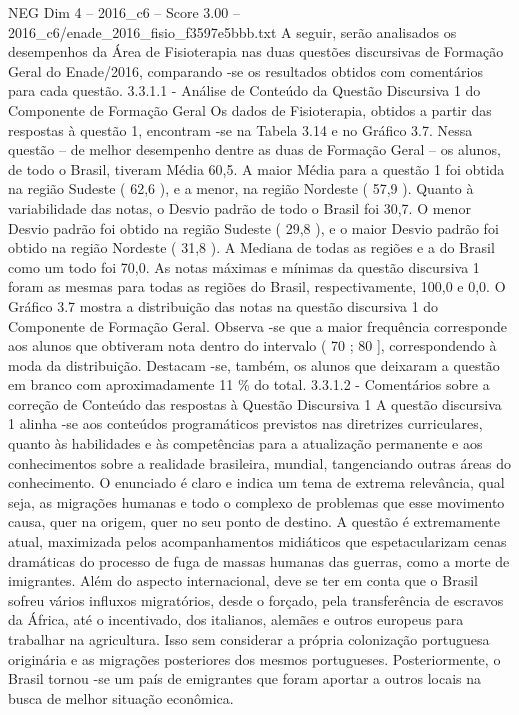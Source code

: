 \begin{textsample}{NEG Dim 4 – 2016\_c6 – Score 3.00 – 2016\_c6/enade\_2016\_fisio\_f3597e5bbb.txt}
A seguir, serão analisados os desempenhos da Área de Fisioterapia nas duas questões discursivas de Formação Geral do Enade/2016, comparando -se os resultados obtidos com comentários para cada questão. 3.3.1.1 - Análise de Conteúdo da Questão Discursiva 1 do Componente de Formação Geral Os dados de Fisioterapia, obtidos a partir das respostas à questão 1, encontram -se na Tabela 3.14 e no Gráfico 3.7.
Nessa questão – de melhor desempenho dentre as duas de Formação Geral – os alunos, de todo o Brasil, tiveram Média 60,5.
A maior Média para a questão 1 foi obtida na região Sudeste ( 62,6 ), e a menor, na região Nordeste ( 57,9 ).
Quanto à variabilidade das notas, o Desvio padrão de todo o Brasil foi 30,7.
O menor Desvio padrão foi obtido na região Sudeste ( 29,8 ), e o maior Desvio padrão foi obtido na região Nordeste ( 31,8 ).
A Mediana de todas as regiões e a do Brasil como um todo foi 70,0.
As notas máximas e mínimas da questão discursiva 1 foram as mesmas para todas as regiões do Brasil, respectivamente, 100,0 e 0,0.
O Gráfico 3.7 mostra a distribuição das notas na questão discursiva 1 do Componente de Formação Geral.
Observa -se que a maior frequência corresponde aos alunos que obtiveram nota dentro do intervalo ( 70 ; 80 ], correspondendo à moda da distribuição.
Destacam -se, também, os alunos que deixaram a questão em branco com aproximadamente 11 \% do total. 3.3.1.2 - Comentários sobre a correção de Conteúdo das respostas à Questão Discursiva 1 A questão discursiva 1 alinha -se aos conteúdos programáticos previstos nas diretrizes curriculares, quanto às habilidades e às competências para a atualização permanente e aos conhecimentos sobre a realidade brasileira, mundial, tangenciando outras áreas do conhecimento.
O enunciado é claro e indica um tema de extrema relevância, qual seja, as migrações humanas e todo o complexo de problemas que esse movimento causa, quer na origem, quer no seu ponto de destino.
A questão é extremamente atual, maximizada pelos acompanhamentos midiáticos que espetacularizam cenas dramáticas do processo de fuga de massas humanas das guerras, como a morte de imigrantes.
Além do aspecto internacional, deve se ter em conta que o Brasil sofreu vários influxos migratórios, desde o forçado, pela transferência de escravos da África, até o incentivado, dos italianos, alemães e outros europeus para trabalhar na agricultura.
Isso sem considerar a própria colonização portuguesa originária e as migrações posteriores dos mesmos portugueses.
Posteriormente, o Brasil tornou -se um país de emigrantes que foram aportar a outros locais na busca de melhor situação econômica.

\end{textsample}
